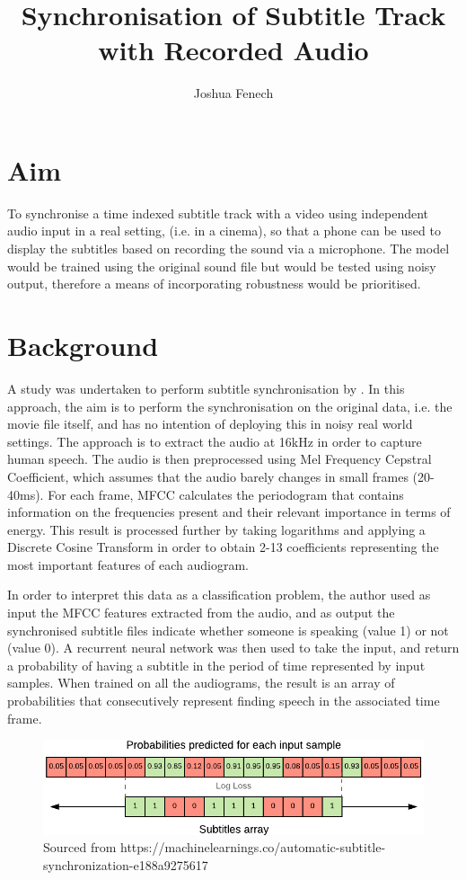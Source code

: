 \documentclass[a4paper]{article}
\title{Synchronisation of Subtitle Track with Recorded Audio}
\author{Joshua Fenech}
\begin{document}
\maketitle

\section{Aim}
To synchronise a time indexed subtitle track with a video using independent audio input in a real setting, (i.e. in a cinema), so that a phone can be used to display the subtitles based on recording the sound via a microphone. The model would be trained using the original sound file but would be tested using noisy output, therefore a means of incorporating robustness would be prioritised.

\section{Background}
A study was undertaken to perform subtitle synchronisation by \cite{sabater_2017}. In this approach, the aim is to perform the synchronisation on the original data, i.e. the movie file itself, and has no intention of deploying this in noisy real world settings. The approach is to extract the audio at 16kHz in order to capture human speech. The audio is then preprocessed using Mel Frequency Cepstral Coefficient, which assumes that the audio barely changes in small frames (20-40ms). For each frame, MFCC calculates the periodogram that contains information on the frequencies present and their relevant importance in terms of energy. This result is processed further by taking logarithms and applying a Discrete Cosine Transform in order to obtain 2-13 coefficients representing the most important features of each audiogram.

In order to interpret this data as a classification problem, the author used as input the MFCC features extracted from the audio, and as output the synchronised subtitle files indicate whether someone is speaking (value 1) or not (value 0). A recurrent neural network was then used to take the input, and return a probability of having a subtitle in the period of time represented by input samples. When trained on all the audiograms, the result is an array of probabilities that consecutively represent finding speech in the associated time frame.

\begin{figure}[h]
	\centering
	\includegraphics[scale=0.5]{prob_array.png}
	\caption{Sourced from https://machinelearnings.co/automatic-subtitle-synchronization-e188a9275617}
\end{figure}
\end{document}
